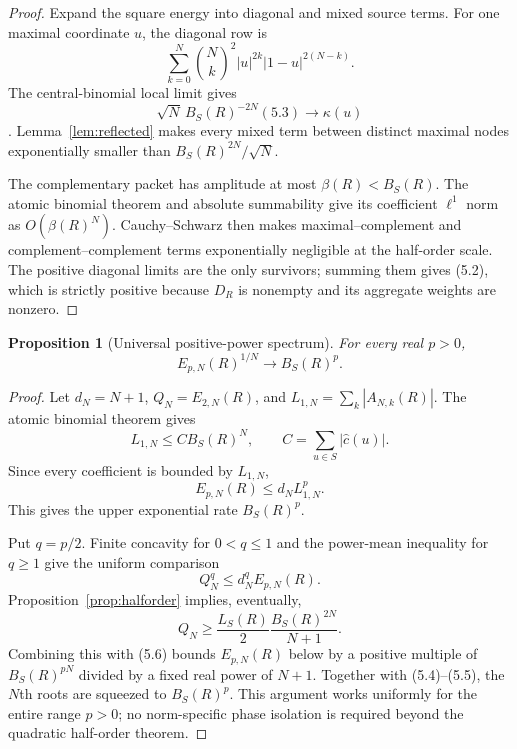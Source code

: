 \documentclass[11pt]{article}
\newtheorem{proposition}[theorem]{Proposition}
\theoremstyle{remark}
\begin{document}
\begin{proof}
Expand the square energy into diagonal and mixed source terms.  For one maximal coordinate $u$,
the diagonal row is
\begin{equation}
 \sum_{k=0}^N\binom Nk^2|u|^{2k}|1-u|^{2(N-k)}.
 \tag{5.3}
\end{equation}
The central-binomial local limit gives
\[
 \sqrt N\,B_S(R)^{-2N}(5.3)\longrightarrow\kappa(u)
\]
\cite{LorentzBernstein}.  Lemma~\ref{lem:reflected} makes every mixed term between distinct
maximal nodes exponentially smaller than $B_S(R)^{2N}/\sqrt N$.

The complementary packet has amplitude at most $\beta(R)<B_S(R)$.  The atomic binomial theorem
and absolute summability give its coefficient $\ell^1$ norm as $O(\beta(R)^N)$.  Cauchy--Schwarz
then makes maximal--complement and complement--complement terms exponentially negligible at the
half-order scale.  The positive diagonal limits are the only survivors; summing them gives
(5.2), which is strictly positive because $D_R$ is nonempty and its aggregate weights are
nonzero.
\end{proof}

\begin{proposition}[Universal positive-power spectrum]
\label{prop:allp}
For every real $p>0$,
\[
 E_{p,N}(R)^{1/N}\longrightarrow B_S(R)^p.
\]
\end{proposition}

\begin{proof}
Let $d_N=N+1$, $Q_N=E_{2,N}(R)$, and
$L_{1,N}=\sum_k|A_{N,k}(R)|$.  The atomic binomial theorem gives
\begin{equation}
 L_{1,N}\le C B_S(R)^N,\qquad C=\sum_{u\in S}|\widehat c(u)|.
 \tag{5.4}
\end{equation}
Since every coefficient is bounded by $L_{1,N}$,
\begin{equation}
 E_{p,N}(R)\le d_N L_{1,N}^p.
 \tag{5.5}
\end{equation}
This gives the upper exponential rate $B_S(R)^p$.

Put $q=p/2$.  Finite concavity for $0<q\le1$ and the power-mean inequality for $q\ge1$ give the
uniform comparison
\begin{equation}
 Q_N^q\le d_N^q E_{p,N}(R).
 \tag{5.6}
\end{equation}
Proposition~\ref{prop:halforder} implies, eventually,
\[
 Q_N\ge \frac{L_S(R)}2\frac{B_S(R)^{2N}}{N+1}.
\]
Combining this with (5.6) bounds $E_{p,N}(R)$ below by a positive multiple of
$B_S(R)^{pN}$ divided by a fixed real power of $N+1$.  Together with (5.4)--(5.5), the $N$th
roots are squeezed to $B_S(R)^p$.  This argument works uniformly for the entire range $p>0$;
no norm-specific phase isolation is required beyond the quadratic half-order theorem.
\end{proof}
\end{document}
